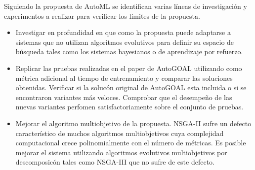 \begin{recomendations}
Siguiendo la propuesta de AutoML se identifican varias l\'ineas de investigaci\'on y experimentos a realizar para verificar los l\'imites de la propuesta.
\begin{itemize}
    \item Investigar en profundidad en que como la propuesta puede adaptarse a sistemas que no utilizan algoritmos evolutivos para definir su espacio de b\'usqueda tales como los sistemas bayesianos o de aprendizaje por refuerzo.
    \item Replicar las pruebas realizadas en el paper de AutoGOAL utilizando como m\'etrica adicional al tiempo de entrenamiento y comparar las soluciones obtenidas. Verificar si la soluc\'on original de AutoGOAL esta incluida o si se encontraron variantes m\'as veloces. Comprobar que el desempe\~no de las  nuevas variantes  perfomen satisfactoriamente sobre el conjunto de pruebas.
    \item Mejorar el algoritmo multiobjetivo de la propuesta. NSGA-II sufre un defecto caracter\'istico de muchos algoritmos multiobjetivos cuya complejidad computacional crece polinomialmente con el n\'umero de m\'etricas. Es posible mejorar el sistema utilizando algoritmos evolutivos multiobjetivos por descomposic\'on tales como NSGA-III que no sufre de este defecto.
\end{itemize}

\end{recomendations}
